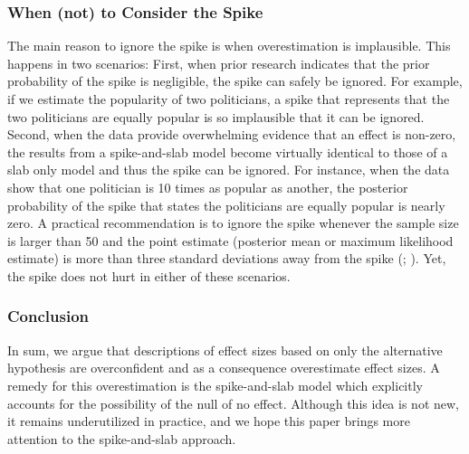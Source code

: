 \documentclass[a4paper]{article}
\begin{document}
\subsubsection*{When (not) to Consider the Spike}
The main reason to ignore the spike is when overestimation is implausible. This happens in two scenarios: First, when prior research indicates that the prior probability of the spike is negligible, the spike can safely be ignored. For example, if we estimate the popularity of two politicians, a spike that represents that the two politicians are equally popular is so implausible that it can be ignored. Second, when the data provide overwhelming evidence that an effect is non-zero, the results from a spike-and-slab model become virtually identical to those of a slab only model and thus the spike can be ignored. For instance, when the data show that one politician is 10 times as popular as another, the posterior probability of the spike that states the politicians are equally popular is nearly zero. A practical recommendation is to ignore the spike whenever the sample size is larger than 50 and the point estimate (posterior mean or maximum likelihood estimate) is more than three standard deviations away from the spike (; ). Yet, the spike does not hurt in either of these scenarios.

\subsubsection*{Conclusion}
In sum, we argue that descriptions of effect sizes based on only the alternative hypothesis are overconfident and as a consequence overestimate effect sizes. A remedy for this overestimation is the spike-and-slab model which explicitly accounts for the possibility of the null of no effect. Although this idea is not new, it remains underutilized in practice, and we hope this paper brings more attention to the spike-and-slab approach.



\end{document}
